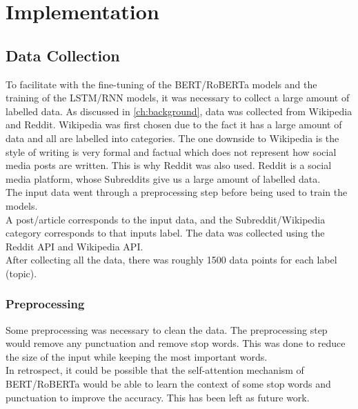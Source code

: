 \chapter{Implementation}
\label{ch:implementation}

\section{Data Collection}\label{sec:data-collection}
To facilitate with the fine-tuning of the BERT/RoBERTa models and the training of the LSTM/RNN models, it was necessary to collect
a large amount of labelled data. As discussed in \cref{ch:background}, data was collected from Wikipedia and Reddit. Wikipedia was first
chosen due to the fact it has a large amount of data and all are labelled into categories. The one downside to Wikipedia is the style
of writing is very formal and factual which does not represent how social media posts are written. This is why Reddit was also used.
Reddit is a social media platform, whose Subreddits give us a large amount of labelled data.\\
The input data went through a preprocessing step before being used to train the models.\\
A post/article corresponds to the input data, and the Subreddit/Wikipedia category corresponds to that inputs label. The data was collected
using the Reddit API and Wikipedia API.\\
After collecting all the data, there was roughly 1500 data points for each label (topic).
\subsection{Preprocessing}
Some preprocessing was necessary to clean the data. The preprocessing step would remove any punctuation and remove stop words. This was done
to reduce the size of the input while keeping the most important words.\\
In retrospect, it could be possible that the self-attention mechanism of BERT/RoBERTa would be able to learn the context of some stop words
and punctuation to improve the accuracy. This has been left as future work.
